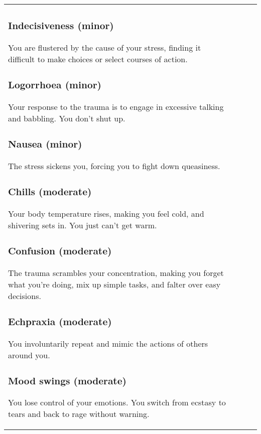 \begin{table}
\begin{tabular}{|p{8cm}|r|r|r|}
\subsubsection{Indecisiveness (minor)} 

You are flustered by the cause of your stress, finding it difficult to make choices or select courses of action. 

\subsubsection{Logorrhoea (minor)} 

Your response to the trauma is to engage in excessive talking and babbling. You don’t shut up. 

\subsubsection{Nausea (minor)} 

The stress sickens you, forcing you to fight down queasiness. 

\subsubsection{Chills (moderate)} 

Your body temperature rises, making you feel cold, and shivering sets in. You just can’t get warm. 

\subsubsection{Confusion (moderate)} 

The trauma scrambles your concentration, making you forget what you’re doing, mix up simple tasks, and falter over easy decisions. 

\subsubsection{Echpraxia (moderate)} 

You involuntarily repeat and mimic the actions of others around you. 

\subsubsection{Mood swings (moderate)} 

You lose control of your emotions. You switch from ecstasy to tears and back to rage without warning. 


\end{tabular}
\end{table}
